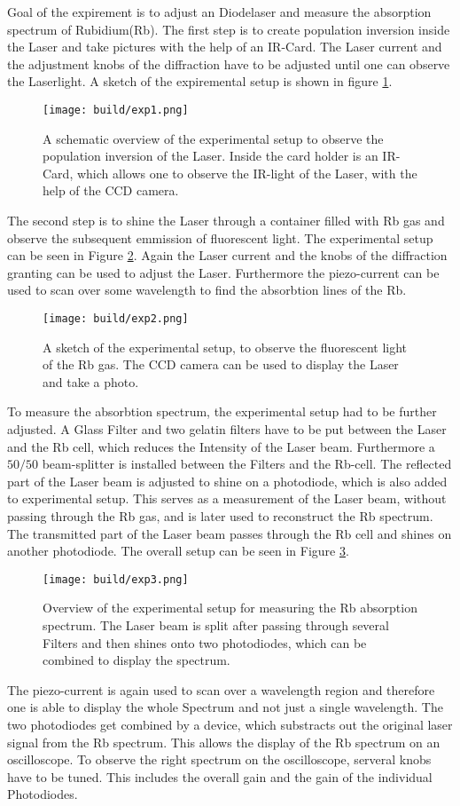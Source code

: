 Goal of the expirement is to adjust an Diodelaser and measure the absorption spectrum of Rubidium(Rb). 
The first step is to create population inversion inside the Laser and take pictures with the help of an IR-Card.
The Laser current and the adjustment knobs of the diffraction have to be adjusted until one can observe the Laserlight.
A sketch of the expiremental setup is shown in figure \ref{fig:exp1}.
\begin{figure}
    \centering
    \texttt{[image: build/exp1.png]}
    \caption{A schematic overview of the experimental setup to observe the population inversion of the Laser. Inside the card holder is an IR-Card, which allows one to observe the IR-light of the Laser, with the help of the CCD camera.\cite{}}
    \label{fig:exp1}
\end{figure}
The second step is to shine the Laser through a container filled with Rb gas and observe the subsequent emmission of fluorescent light.  The experimental setup can be seen in Figure \ref{fig:exp2}. Again the Laser current and the knobs of the diffraction granting can be used to adjust the Laser. Furthermore the piezo-current can be used to scan over some wavelength to find the absorbtion lines of the Rb.
\begin{figure}
    \centering
    \texttt{[image: build/exp2.png]}
    \caption{A sketch of the experimental setup, to observe the fluorescent light of the Rb gas. The CCD camera can be used to display the Laser and take a photo. }
    \label{fig:exp2}
\end{figure}
To  measure the absorbtion spectrum, the experimental setup had to be further adjusted. A Glass Filter and two gelatin filters have to be put between the Laser and the Rb cell, which reduces the Intensity of the Laser beam. 
Furthermore a $50/50$ beam-splitter is installed between the Filters and the Rb-cell. The reflected part of the Laser beam is adjusted to shine on a photodiode, which is also added to experimental setup. This serves as a measurement of the Laser beam, without passing through the Rb gas, and is later used to reconstruct the Rb spectrum.
The transmitted part of the Laser beam passes through the Rb cell and shines on another photodiode. The overall setup can be seen in Figure \ref{fig:exp3}.
\begin{figure}
    \centering
    \texttt{[image: build/exp3.png]}
    \caption{ Overview of the experimental setup for measuring the Rb absorption spectrum. The Laser beam is split after passing through several Filters and then shines onto two photodiodes, which can be combined to display the spectrum.\cite{} }
    \label{fig:exp3}
\end{figure}
The piezo-current is again used to scan over a wavelength region and therefore one is able to display the whole Spectrum and not just a single wavelength.
The two photodiodes get combined by a device, which substracts out the original laser signal from the Rb spectrum. This allows the display of the Rb spectrum on an oscilloscope. To observe the right spectrum on the oscilloscope, serveral knobs have to be tuned. This includes the overall gain and the gain of the individual Photodiodes.

